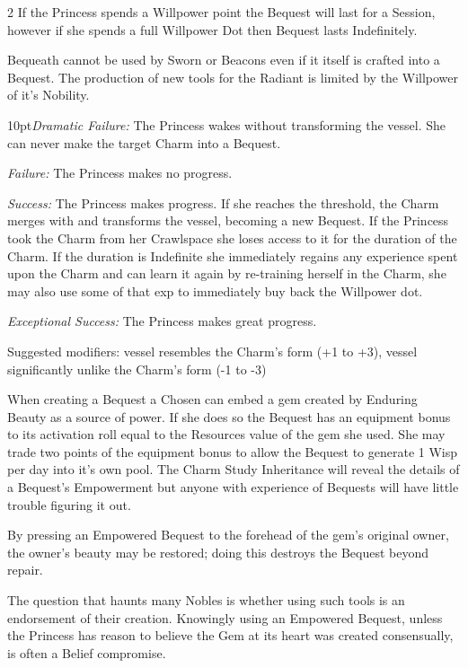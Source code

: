 \begin{multicols}{2}
If the Princess spends a Willpower point the Bequest will last for a Session, however if she spends a full Willpower Dot then Bequest lasts Indefinitely. 

Bequeath cannot be used by Sworn or Beacons even if it itself is crafted into a Bequest. The production of new tools for the Radiant is limited by the Willpower of it's Nobility. 

    \begin{myindentpar}{10pt}\emph{Dramatic Failure:} The Princess wakes without transforming the vessel. She can never make the target Charm into a Bequest.

    \emph{Failure:} The Princess makes no progress.

    \emph{Success:} The Princess makes progress. If she reaches the threshold, the Charm merges with and transforms the vessel, becoming a new Bequest. If the Princess took the Charm from her Crawlspace she loses access to it for the duration of the Charm. If the duration is Indefinite she immediately regains any experience spent upon the Charm and can learn it again by re-training herself in the Charm, she may also use some of that exp to immediately buy back the Willpower dot.

    \emph{Exceptional Success:} The Princess makes great progress.

Suggested modifiers: vessel resembles the Charm's form (+1 to +3), vessel significantly unlike the Charm's form (-1 to -3)\end{myindentpar} 

When creating a Bequest a Chosen can embed a gem created by Enduring Beauty as a source of power. If she does so the Bequest has an equipment bonus to its activation roll equal to the Resources value of the gem she used. She may trade two points of the equipment bonus to allow the Bequest to generate 1 Wisp per day into it's own pool. The Charm Study Inheritance will reveal the details of a Bequest's Empowerment but anyone with experience of Bequests will have little trouble figuring it out.

By pressing an Empowered Bequest to the forehead of the gem's original owner, the owner's beauty may be restored; doing this destroys the Bequest beyond repair.

The question that haunts many Nobles is whether using such tools is an endorsement of their creation. Knowingly using an Empowered Bequest, unless the Princess has reason to believe the Gem at its heart was created consensually, is often a Belief compromise.


\end{multicols}
